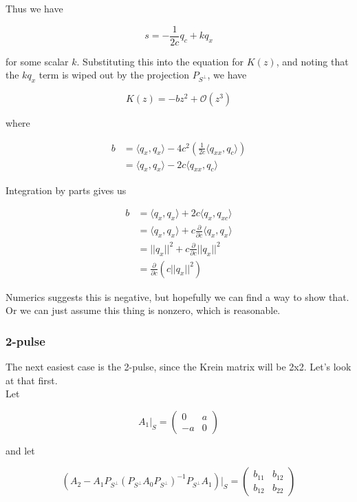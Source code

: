 \documentclass[12pt]{article}
\begin{document}
Thus we have

\[
s = -\frac{1}{2c} q_c + k q_x
\]

for some scalar $k$. Substituting this into the equation for $K(z)$, and noting that the $k q_x$ term is wiped out by the projection $P_{S^\perp}$, we have

\[
K(z) = -b z^2 + \mathcal{O}(z^3)
\]

where

\begin{align*}
b &= \langle q_x, q_x \rangle - 4 c^2 \left(\frac{1}{2c} \langle q_{xx}, q_c \rangle \right)  \\
&= \langle q_x, q_x \rangle - 2 c \langle q_{xx}, q_c \rangle
\end{align*}

Integration by parts gives us

\begin{align*}
b &= \langle q_x, q_x \rangle + 2c \langle q_{x}, q_{xc} \rangle  \\
&= \langle q_x, q_x \rangle + c \frac{\partial}{\partial c}\langle q_x, q_x \rangle \\
&= ||q_x||^2 + c \frac{\partial}{\partial c}||q_x||^2 \\
&= \frac{\partial}{\partial c} \left( c||q_x||^2 \right)
\end{align*}

Numerics suggests this is negative, but hopefully we can find a way to show that. Or we can just assume this thing is nonzero, which is reasonable.

\subsubsection{2-pulse}

The next easiest case is the 2-pulse, since the Krein matrix will be 2x2. Let's look at that first. \\

Let 

\[
A_1|_S = \begin{pmatrix} 0 & a \\ -a & 0 \end{pmatrix}
\]

and let

\[
\left( A_2 - A_1 P_{S^\perp} (P_{S^\perp} A_0 P_{S^\perp})^{-1} P_{S^\perp} A_1 \right)|_S = \begin{pmatrix} b_{11} & b_{12} \\ b_{12} & b_{22} \end{pmatrix}
\]
\end{document}
